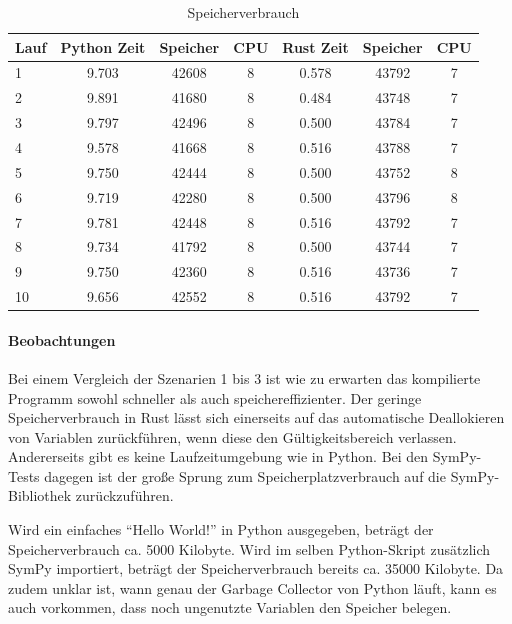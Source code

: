 \documentclass[11pt,a4paper, ngerman]{article}
\begin{document}
\begin{table}[ht!]
    \caption{Speicherverbrauch}
    \centering
    \begin{tabular}{|l|c|c|c|c|c|c|}
        \hline
        \textbf{Lauf} & \textbf{Python Zeit} & \textbf{Speicher} & \textbf{CPU} & \textbf{Rust Zeit} & \textbf{Speicher} & \textbf{CPU} \\
        \hline
        1 & 9.703 & 42608 & 8 & 0.578 & 43792 & 7 \\
        \hline
        2 & 9.891 & 41680 & 8 & 0.484 & 43748 & 7 \\
        \hline
        3 & 9.797 & 42496 & 8 & 0.500 & 43784 & 7 \\
        \hline
        4 & 9.578 & 41668 & 8 & 0.516 & 43788 & 7 \\
        \hline
        5 & 9.750 & 42444 & 8 & 0.500 & 43752 & 8 \\
        \hline
        6 & 9.719 & 42280 & 8 & 0.500 & 43796 & 8 \\
        \hline
        7 & 9.781 & 42448 & 8 & 0.516 & 43792 & 7 \\
        \hline
        8 & 9.734 & 41792 & 8 & 0.500 & 43744 & 7 \\
        \hline
        9 & 9.750 & 42360 & 8 & 0.516 & 43736 & 7 \\
        \hline
        10 & 9.656 & 42552 & 8 & 0.516 & 43792 & 7 \\
        \hline
    \end{tabular}
\end{table}

\paragraph{Beobachtungen} Bei einem Vergleich der Szenarien 1 bis 3 ist wie zu erwarten das kompilierte Programm sowohl schneller als auch speichereffizienter. Der geringe Speicherverbrauch in Rust lässt sich einerseits auf das automatische Deallokieren von Variablen zurückführen, wenn diese den Gültigkeitsbereich verlassen. Andererseits gibt es keine Laufzeitumgebung wie in Python. Bei den SymPy-Tests dagegen ist der große Sprung zum Speicherplatzverbrauch auf die SymPy-Bibliothek zurückzuführen.

Wird ein einfaches ``Hello World!'' in Python ausgegeben, beträgt der Speicherverbrauch ca. 5000 Kilobyte. Wird im selben Python-Skript zusätzlich SymPy importiert, beträgt der Speicherverbrauch bereits ca. 35000 Kilobyte. Da zudem unklar ist, wann genau der Garbage Collector von Python läuft, kann es auch vorkommen, dass noch ungenutzte Variablen den Speicher belegen.
\end{document}
